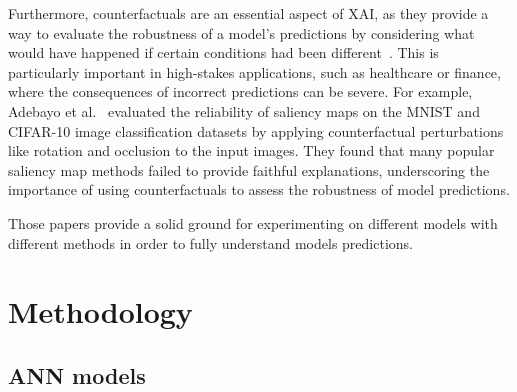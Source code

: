 \documentclass[journal, a4paper]{IEEEtran}
\begin{document}
Furthermore, counterfactuals are an essential aspect of XAI, as they provide a way to evaluate the robustness of a model's predictions by considering what would have happened if certain conditions had been different~\cite{adebayo2018sanity}.
This is particularly important in high-stakes applications, such as healthcare or finance, where the consequences of incorrect predictions can be severe.
For example, Adebayo et al.~\cite{adebayo2018sanity} evaluated the reliability of saliency maps on the MNIST and CIFAR-10 image classification datasets by applying counterfactual perturbations like rotation and occlusion to the input images.
They found that many popular saliency map methods failed to provide faithful explanations, underscoring the importance of using counterfactuals to assess the robustness of model predictions.

Those papers provide a solid ground for experimenting on different models with different methods in order to fully understand models predictions.
\section{Methodology}\label{sec:methodology}

\subsection{ANN models}\label{subsec:ann-models}
\end{document}
